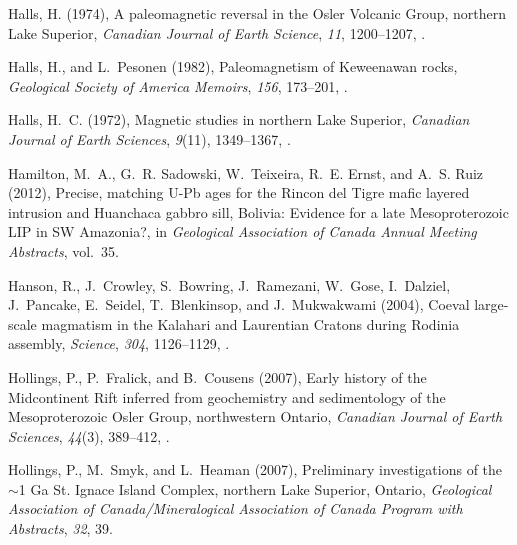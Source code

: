 \documentclass[draft,gc]{AGUTeX}
\begin{document}
\begin{article}
\begin{thebibliography}{24}
Halls, H. (1974), A paleomagnetic reversal in the {O}sler {V}olcanic {G}roup,
  northern {L}ake {S}uperior, \textit{Canadian Journal of Earth Science},
  \textit{11}, 1200--1207, .

Halls, H., and L.~Pesonen (1982), Paleomagnetism of {K}eweenawan rocks,
  \textit{Geological Society of America Memoirs}, \textit{156}, 173--201,
  .

Halls, H.~C. (1972), Magnetic studies in northern {L}ake {S}uperior,
  \textit{Canadian Journal of Earth Sciences}, \textit{9}(11), 1349--1367,
  .

Hamilton, M.~A., G.~R. Sadowski, W.~Teixeira, R.~E. Ernst, and A.~S. Ruiz
  (2012), {Precise, matching U-Pb ages for the Rincon del Tigre mafic layered
  intrusion and Huanchaca gabbro sill, Bolivia: Evidence for a late
  Mesoproterozoic LIP in SW Amazonia?}, in \textit{Geological Association of
  Canada Annual Meeting Abstracts}, vol.~35.

Hanson, R., J.~Crowley, S.~Bowring, J.~Ramezani, W.~Gose, I.~Dalziel,
  J.~Pancake, E.~Seidel, T.~Blenkinsop, and J.~Mukwakwami (2004), Coeval
  large-scale magmatism in the {K}alahari and {L}aurentian {C}ratons during
  {R}odinia assembly, \textit{Science}, \textit{304}, 1126--1129,
  .

Hollings, P., P.~Fralick, and B.~Cousens (2007{}), {Early history
  of the Midcontinent Rift inferred from geochemistry and sedimentology of the
  Mesoproterozoic Osler Group, northwestern Ontario}, \textit{Canadian Journal
  of Earth Sciences}, \textit{44}(3), 389--412, .

Hollings, P., M.~Smyk, and L.~Heaman (2007{}), Preliminary
  investigations of the $\sim$1 {Ga St. Ignace Island Complex, northern Lake
  Superior, Ontario}, \textit{Geological Association of Canada/Mineralogical
  Association of Canada Program with Abstracts}, \textit{32}, 39.


\end{thebibliography}
\end{article}
\end{document}
